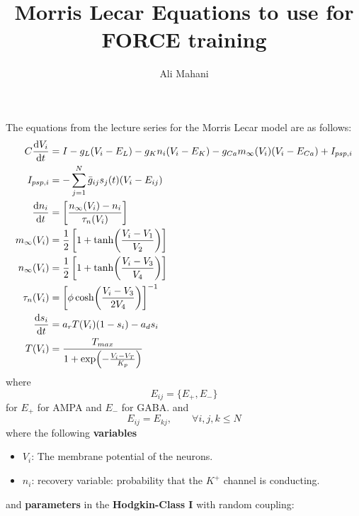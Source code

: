 \documentclass[12pt, letter]{article}
\author{Ali Mahani}
\title{Morris Lecar Equations to use for FORCE training}
\begin{document}
	\maketitle
	
	The equations from the lecture series for the Morris Lecar model are as follows:
	\begin{equation}
		\begin{aligned}
			C\dv{V_i}{t} &= I - g_L(V_i - E_L) - g_K n_i (V_i - E_K) - g_{Ca} m_\infty(V_i) (V_i - E_{Ca}) + I_{psp, i}\\
			I_{psp, i} &= -\sum_{j=1}^{N} \bar{g}_{ij} s_j(t) (V_i - E_{ij})\\
			\dv{n_i}{t} &= \left[\frac{n_\infty(V_i) - n_i}{\tau_n(V_i)}\right]\\
			m_\infty(V_i) &= \frac{1}{2} \left[1 + \tanh(\frac{V_i - V_1}{V_2})\right]\\
			n_\infty(V_i) &= \frac{1}{2} \left[1 + \tanh(\frac{V_i - V_3}{V_4})\right]\\
			\tau_n(V_i) &= \left[\phi \cosh(\frac{V_i - V_3}{2 V_4})\right]^{-1}\\
			\dv{s_i}{t} &= a_r T(V_i)(1 - s_i) - a_d s_i\\
			T(V_i) &= \frac{T_{max}}{1 + \exp(-\frac{V_i - V_T}{K_p})}					
		\end{aligned}
	\end{equation}
	where 
	\begin{equation}
		E_{ij} = \{E_+, E_-\}
	\end{equation}
	for $E_+$ for AMPA and $E_-$ for GABA.
	and 
	\begin{equation}
		E_{ij} = E_{kj}, \qquad \forall i,j,k \le N
	\end{equation}
	where the following \textbf{variables}
	\begin{itemize}
		\item $V_i$: The membrane potential of the neurons.
		\item $n_i$: recovery variable: probability that the $K^+$ channel is conducting. 
	\end{itemize}
	and \textbf{parameters} in the \textbf{Hodgkin-Class I} with random coupling:
\end{document}
